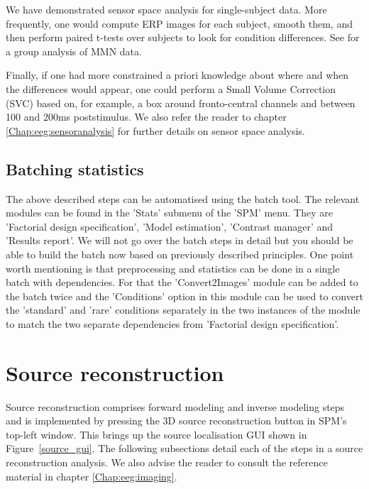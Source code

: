 We have demonstrated sensor space analysis for single-subject data. More frequently, one would compute ERP images for each subject, smooth them, and then perform paired t-tests over subjects to look for condition differences. See \cite{marta_mmndcm} for a group analysis of MMN data.

Finally, if one had more constrained a priori knowledge about where and when the differences would appear, one could perform a Small Volume Correction (SVC) based on, for example, a box around fronto-central channels and between 100 and 200ms poststimulus. We also refer the reader to chapter \ref{Chap:eeg:sensoranalysis} for further details on sensor space analysis.

\subsection{Batching statistics}
The above described steps can be automatised using the batch tool. The relevant modules can be found in the 'Stats' submenu of the 'SPM' menu. They are 'Factorial design specification', 'Model estimation', 'Contrast manager' and 'Results report'. We will not go over the batch steps in detail but you should be able to build the batch now based on previously described principles. One point worth mentioning is that preprocessing and statistics can be done in a single batch with dependencies. For that the 'Convert2Images' module can be added to the batch twice and the 'Conditions' option in this module can be used to convert the 'standard' and 'rare' conditions separately  in the two instances of the module to match the two separate dependencies from 'Factorial design specification'.

\section{Source reconstruction}

Source reconstruction comprises forward modeling and inverse modeling steps and is implemented by pressing the 3D source reconstruction button in SPM's top-left window.
This brings up the source localisation GUI shown in Figure~\ref{source_gui}. The following subsections detail each of the steps in a source reconstruction analysis. We also advise the reader to consult the reference material in chapter \ref{Chap:eeg:imaging}.

